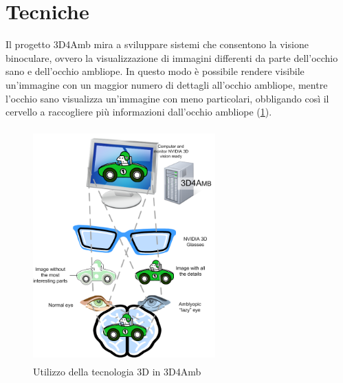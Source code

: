 \documentclass[12pt,a4paper,openright,twoside]{book}
\begin{document}
    \section{Tecniche}
    Il progetto 3D4Amb mira a sviluppare sistemi che consentono la visione binoculare, ovvero la visualizzazione di immagini differenti da parte dell'occhio sano e dell'occhio ambliope. In questo modo è possibile rendere visibile un'immagine con un maggior numero di dettagli all'occhio ambliope, mentre l'occhio sano visualizza un'immagine con meno particolari, obbligando così il cervello a raccogliere più informazioni dall'occhio ambliope (\figurename \ref{fig:visione}).
     \begin{figure}[h]
    	\centering   	
    	\includegraphics[width=7cm, height=9cm]{visione.png}
    	\caption{Utilizzo della tecnologia 3D in 3D4Amb}
    	\label{fig:visione}
    \end{figure}
\end{document}
